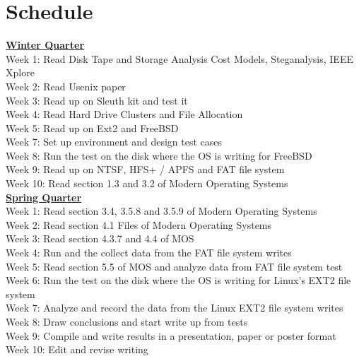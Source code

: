 \documentclass[a4paper]{article}
\begin{document}
\section{Schedule}
\textbf{\underline{Winter Quarter}}\\
Week 1: Read Disk Tape and Storage Analysis Cost Models, Steganalysis, IEEE Xplore\\
Week 2: Read Usenix paper\\
Week 3: Read up on Sleuth kit and test it\\
Week 4: Read Hard Drive Clusters and File Allocation\\
Week 5: Read up on Ext2 and FreeBSD\\
Week 7: Set up environment and design test cases\\
Week 8: Run the test on the disk where the OS is writing for FreeBSD\\
Week 9: Read up on NTSF, HFS+ / APFS and FAT file system\\
Week 10: Read section 1.3 and 3.2 of Modern Operating Systems\\

\textbf{\underline{Spring Quarter}}\\
Week 1: Read section 3.4, 3.5.8 and 3.5.9 of Modern Operating Systems\\
Week 2: Read section 4.1 Files of Modern Operating Systems\\
Week 3: Read section 4.3.7 and 4.4 of MOS\\
Week 4: Run and the collect data from the FAT file system writes\\
Week 5: Read section 5.5 of MOS and analyze data from FAT file system test\\
Week 6: Run the test on the disk where the OS is writing for Linux’s EXT2 file system\\
Week 7: Analyze and record the data from the Linux EXT2 file system writes\\
Week 8: Draw conclusions and start write up from tests\\
Week 9: Compile and write results in a presentation, paper or poster format\\
Week 10: Edit and revise writing\\
\end{document}
